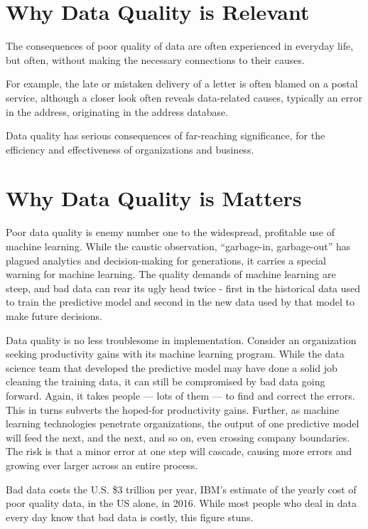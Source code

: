 \section{Why Data Quality is Relevant}

The consequences of poor quality of data are often experienced in everyday life, but often, without making the necessary connections to their causes.

For example, the late or mistaken delivery of a letter is often blamed on a postal service, although  a closer look often reveals data-related causes, typically an error in the address, originating in the address database.

Data quality has serious consequences of far-reaching significance, for the efficiency and effectiveness of organizations and business.



\section{Why Data Quality is Matters}

Poor data quality is enemy number one to the widespread, profitable use of machine learning. While the caustic observation, “garbage-in, garbage-out” has plagued analytics and decision-making for generations, it carries a special warning for machine learning. The quality demands of machine learning are steep, 
and bad data can rear its ugly head twice - first in the historical data used to train the predictive model and second in the new data used by that model to make future decisions. ~\cite{RedmanHBR2018}

Data quality is no less troublesome in implementation. Consider an organization seeking productivity gains with its machine learning program. While the data science team that developed the predictive model may have done a solid job cleaning the training data, it can still be compromised by bad data going forward. Again, it takes people — lots of them — to find and correct the errors. This in turns subverts the hoped-for productivity gains. Further, as machine learning technologies penetrate organizations, 
the output of one predictive model will feed the next, and the next, and so on, even crossing company boundaries. The risk is that a minor error at one step will cascade, causing more errors and growing ever larger across an entire process.

Bad data costs the U.S. \$3 trillion per year, IBM’s estimate of the yearly cost of poor quality data, in the US alone, in 2016. While most people who deal in data every day know that bad data is costly, this figure stuns. ~\cite{ibmInfoGraphic}


